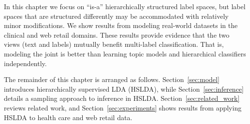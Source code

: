 
In this chapter we focus on ``is-a'' hierarchically structured label spaces, but label spaces that are structured differently may be accommodated with relatively minor modifications. 
%
%
We show results from modeling real-world datasets in the clinical and web
retail domains. These results provide evidence that the two views (text and labels) mutually benefit  multi-label
classification.%
That is, modeling the joint  is better than learning 
topic models and hierarchical classifiers
independently. 

The remainder of this chapter is arranged as follows. Section~\ref{sec:model}
introduces hierarchically supervised LDA (HSLDA), while
Section~\ref{sec:inference} details a sampling approach to inference in HSLDA. 
Section~\ref{sec:related_work} reviews related work, and
Section~\ref{sec:experiments} shows results from applying HSLDA to health care
and web retail data.  


